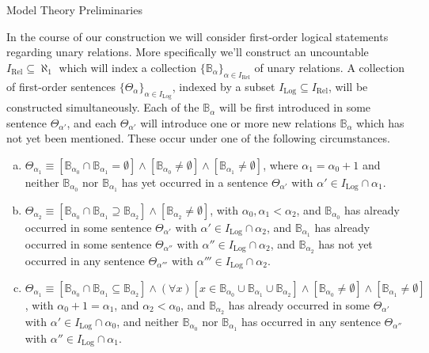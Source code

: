 \documentclass{amsart}
\theoremstyle{definition}\newtheorem{theorem}{Theorem}
\theoremstyle{definition}\newtheorem{bigtheorem}{Theorem}
\numberwithin{theorem}{section}
\theoremstyle{definition}\newtheorem{corollary}[theorem]{Corollary}
\theoremstyle{definition}\newtheorem{proposition}[theorem]{Proposition}
\theoremstyle{definition}\newtheorem{definition}[theorem]{Definition}
\theoremstyle{definition}\newtheorem{question}[theorem]{Question}
\theoremstyle{definition}\newtheorem{example}[theorem]{Example}
\theoremstyle{definition}\newtheorem{remark}[theorem]{Remark}
\theoremstyle{definition}\newtheorem{note}[theorem]{Note}
\theoremstyle{definition}\newtheorem{lemma}[theorem]{Lemma}
\theoremstyle{definition}\newtheorem{fact}[theorem]{Fact}
\theoremstyle{definition}\newtheorem{define}[theorem]{Definition}
\theoremstyle{definition}\newtheorem{definitions}[theorem]{Definitions}
\theoremstyle{definition}\newtheorem{claim}[theorem]{Claim}
\theoremstyle{definition}\newtheorem{obs}[theorem]{Observation}
\theoremstyle{definition}\newtheorem{construction}[theorem]{Construction}
\newcommand{\B}{\mathbb{B}}
\newcommand{\Rel}{\operatorname{Rel}}
\newcommand{\Log}{\operatorname{Log}}
\begin{document}
\begin{section}{Model Theory Preliminaries}\label{modelth}


In the course of our construction we will consider first-order logical statements regarding unary relations.  More specifically we'll construct an uncountable $I_{\Rel} \subseteq \aleph_1$ which will index a collection $\{\B_{\alpha}\}_{\alpha \in I_{\Rel}}$ of unary relations.  A collection of first-order sentences $\{\Theta_{\alpha}\}_{\alpha \in I_{\Log}}$, indexed by a subset $I_{\Log} \subseteq I_{\Rel}$, will be constructed simultaneously.  Each of the $\B_{\alpha}$ will be first introduced in some sentence $\Theta_{\alpha'}$, and each $\Theta_{\alpha'}$ will introduce one or more new relations $\B_{\alpha}$ which has not yet been mentioned.  These occur under one of the following circumstances.

\begin{enumerate}[(a)]

\item $\Theta_{\alpha_1} \equiv [\B_{\alpha_0} \cap \B_{\alpha_1} = \emptyset] \wedge [\B_{\alpha_0} \neq \emptyset]\wedge[\B_{\alpha_1} \neq \emptyset]$, where $\alpha_1 = \alpha_0 +1$ and neither $\B_{\alpha_0}$ nor $\B_{\alpha_1}$ has yet occurred in a sentence $\Theta_{\alpha'}$ with $\alpha' \in I_{\Log} \cap \alpha_1$.

\item $\Theta_{\alpha_2} \equiv [\B_{\alpha_0} \cap \B_{\alpha_1} \supseteq \B_{\alpha_2}]\wedge [\B_{\alpha_2} \neq \emptyset]$, with $\alpha_0, \alpha_1 < \alpha_2$, and $\B_{\alpha_0}$ has already occurred in some sentence $\Theta_{\alpha'}$ with $\alpha' \in I_{\Log} \cap \alpha_2$, and $\B_{\alpha_1}$ has already occurred in some sentence $\Theta_{\alpha''}$ with $\alpha'' \in I_{\Log} \cap \alpha_2$, and $\B_{\alpha_2}$ has not yet occurred in any sentence $\Theta_{\alpha'''}$ with $\alpha'''\in I_{\Log} \cap \alpha_2$.

\item $\Theta_{\alpha_1} \equiv [\B_{\alpha_0} \cap \B_{\alpha_1} \subseteq \B_{\alpha_2}] \wedge (\forall x)[x\in \B_{\alpha_0} \cup \B_{\alpha_1} \cup \B_{\alpha_2}]\wedge[\B_{\alpha_0}\neq \emptyset]\wedge[\B_{\alpha_1} \neq \emptyset]$, with $\alpha_0 + 1 = \alpha_1$, and $\alpha_2 < \alpha_0$, and $\B_{\alpha_2}$ has already occurred in some $\Theta_{\alpha'}$ with $\alpha' \in I_{\Log} \cap \alpha_0$, and neither $\B_{\alpha_0}$ nor $\B_{\alpha_1}$ has occurred in any sentence $\Theta_{\alpha''}$ with $\alpha'' \in I_{\Log} \cap \alpha_1$.



\end{enumerate}
\end{section}
\end{document}
